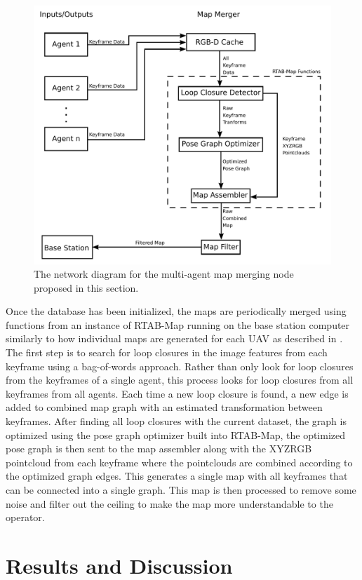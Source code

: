 \documentclass[letterpaper, 10 pt, conference]{ieeeconf}  %
\begin{document}
\begin{figure}
\centering
\includegraphics[width=0.7\linewidth]{map_merger_network}
\caption{The network diagram for the multi-agent map merging node proposed in this section.}
\label{fig:map_merge}
\end{figure}

Once the database has been initialized, the maps are periodically merged using functions from an instance of RTAB-Map running on the base station computer similarly to how individual maps are generated for each UAV as described in \cite{Labbe2011}\cite{Labbe2013}\cite{Labbe2019}. The first step is to search for loop closures in the image features from each keyframe using a bag-of-words approach. Rather than only look for loop closures from the keyframes of a single agent, this process looks for loop closures from all keyframes from all agents. Each time a new loop closure is found, a new edge is added to combined map graph with an estimated transformation between keyframes. After finding all loop closures with the current dataset, the graph is optimized using the pose graph optimizer built into RTAB-Map, the optimized pose graph is then sent to the map assembler along with the XYZRGB pointcloud from each keyframe where the pointclouds are combined according to the optimized graph edges. This generates a single map with all keyframes that can be connected into a single graph. This map is then processed to remove some noise and filter out the ceiling to make the map more understandable to the operator.
\section{Results and Discussion}\label{results}
\end{document}
